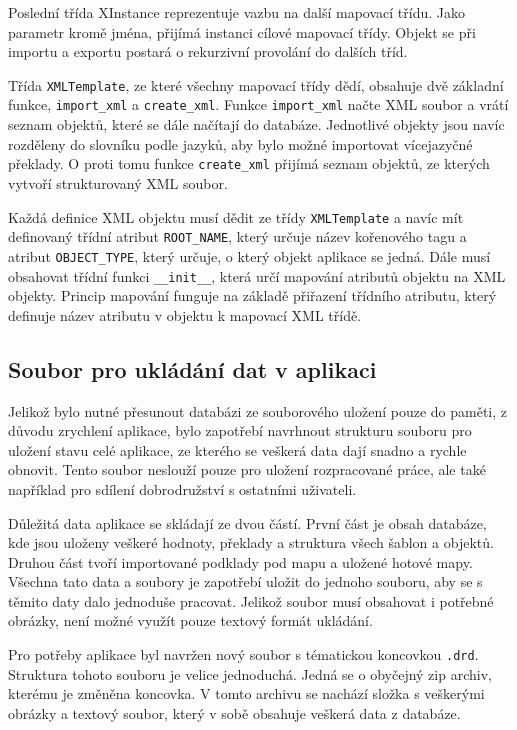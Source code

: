 \documentclass[thesis=B,czech]{resources/FITthesis}[2012/06/26]
\begin{document}
Poslední třída XInstance reprezentuje vazbu na další mapovací třídu. Jako parametr kromě jména, přijímá instanci cílové mapovací třídy. Objekt se při importu a exportu postará o rekurzivní provolání do dalších tříd. \par

Třída \texttt{XMLTemplate}, ze které všechny mapovací třídy dědí, obsahuje dvě základní funkce, \texttt{import\_xml} a \texttt{create\_xml}. Funkce \texttt{import\_xml} načte XML soubor a vrátí seznam objektů, které se dále načítají do databáze. Jednotlivé objekty jsou navíc rozděleny do slovníku podle jazyků, aby bylo možné importovat vícejazyčné překlady. O proti tomu funkce \texttt{create\_xml} přijímá seznam objektů, ze kterých vytvoří strukturovaný XML soubor. \par

Každá definice XML objektu musí dědit ze třídy \texttt{XMLTemplate} a navíc mít definovaný třídní atribut \texttt{ROOT\_NAME}, který určuje název kořenového tagu a atribut \texttt{OBJECT\_TYPE}, který určuje, o který objekt aplikace se jedná. Dále musí obsahovat třídní funkci \texttt{\_\_init\_\_}, která určí mapování atributů objektu na XML objekty. Princip mapování funguje na základě přiřazení třídního atributu, který definuje název atributu v objektu k mapovací XML třídě. 

	\subsection{Soubor pro ukládání dat v aplikaci}
Jelikož bylo nutné přesunout databázi ze souborového uložení pouze do paměti, z důvodu zrychlení aplikace, bylo zapotřebí navrhnout strukturu souboru pro uložení stavu celé aplikace, ze kterého se veškerá data dají snadno a rychle obnovit. Tento soubor neslouží pouze pro uložení rozpracované práce, ale také například pro sdílení dobrodružství s ostatními uživateli. \par

Důležitá data aplikace se skládají ze dvou částí. První část je obsah databáze, kde jsou uloženy veškeré hodnoty, překlady a struktura všech šablon a objektů. Druhou část tvoří importované podklady pod mapu a uložené hotové mapy. Všechna tato data a soubory je zapotřebí uložit do jednoho souboru, aby se s těmito daty dalo jednoduše pracovat. Jelikož soubor musí obsahovat i potřebné obrázky, není možné využít pouze textový formát ukládání. \par

Pro potřeby aplikace byl navržen nový soubor s tématickou koncovkou \texttt{.drd}. Struktura tohoto souboru je velice jednoduchá. Jedná se o obyčejný zip archiv, kterému je změněna koncovka. V tomto archivu se nachází složka s veškerými obrázky a textový soubor, který v sobě obsahuje veškerá data z databáze. \par
\end{document}
